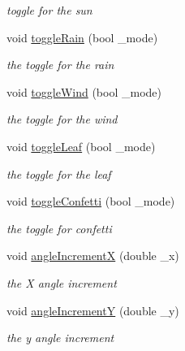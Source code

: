 \begin{DoxyCompactItemize}
\begin{DoxyCompactList}\small\item\em toggle for the sun \item\end{DoxyCompactList}\item 
void \hyperlink{classGLWindow_a9d5345d6c524c26f3d9e275215e2114a}{toggleRain} (bool \_\-mode)
\begin{DoxyCompactList}\small\item\em the toggle for the rain \item\end{DoxyCompactList}\item 
void \hyperlink{classGLWindow_a952711eae2feee75a9b0cef3fe5ee319}{toggleWind} (bool \_\-mode)
\begin{DoxyCompactList}\small\item\em the toggle for the wind \item\end{DoxyCompactList}\item 
void \hyperlink{classGLWindow_a405855727f72c698f1265765271fcfad}{toggleLeaf} (bool \_\-mode)
\begin{DoxyCompactList}\small\item\em the toggle for the leaf \item\end{DoxyCompactList}\item 
void \hyperlink{classGLWindow_a924417cfa710d3d125fa7a046d90ddb8}{toggleConfetti} (bool \_\-mode)
\begin{DoxyCompactList}\small\item\em the toggle for confetti \item\end{DoxyCompactList}\item 
void \hyperlink{classGLWindow_a2e8c81886b99733cd341b64dc324ebf1}{angleIncrementX} (double \_\-x)
\begin{DoxyCompactList}\small\item\em the X angle increment \item\end{DoxyCompactList}\item 
void \hyperlink{classGLWindow_a4a47782943f7050554d040fe32428a35}{angleIncrementY} (double \_\-y)
\begin{DoxyCompactList}\small\item\em the y angle increment \item\end{DoxyCompactList}\item 

\end{DoxyCompactItemize}
